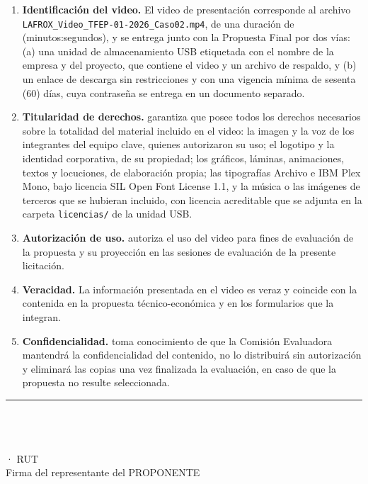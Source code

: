 \documentclass[carta,firma,final]{lafrox}
\newcommand{\campo}[1]{\underline{\makebox[#1]{}}}
\begin{document}
\begin{enumerate}
  \item \textbf{Identificación del video.} El video de presentación corresponde al archivo\linebreak
  \texttt{LAFROX\_Video\_TFEP-01-2026\_Caso02.mp4}, de una duración de \campo{1.6cm} (minutos:segundos),
  y se entrega junto con la Propuesta Final por dos vías: (a) una unidad de almacenamiento USB etiquetada con
  el nombre de la empresa y del proyecto, que contiene el video y un archivo de respaldo, y (b) un enlace de
  descarga sin restricciones y con una vigencia mínima de sesenta (60) días, cuya contraseña se entrega en un
  documento separado.

  \item \textbf{Titularidad de derechos.} \LFXempresa{} garantiza que posee todos los derechos necesarios
  sobre la totalidad del material incluido en el video: la imagen y la voz de los integrantes del equipo
  clave, quienes autorizaron su uso; el logotipo y la identidad corporativa, de su propiedad; los gráficos,
  láminas, animaciones, textos y locuciones, de elaboración propia; las tipografías Archivo e IBM Plex Mono,
  bajo licencia SIL Open Font License 1.1, y la música o las imágenes de terceros que se hubieran incluido,
  con licencia acreditable que se adjunta en la carpeta \texttt{licencias/} de la unidad USB.

  \item \textbf{Autorización de uso.} \LFXempresa{} autoriza el uso del video para fines de evaluación de la
  propuesta y su proyección en las sesiones de evaluación de la presente licitación.

  \item \textbf{Veracidad.} La información presentada en el video es veraz y coincide con la contenida en la
  propuesta técnico-económica y en los formularios que la integran.

  \item \textbf{Confidencialidad.} \LFXempresa{} toma conocimiento de que la Comisión Evaluadora mantendrá la
  confidencialidad del contenido, no lo distribuirá sin autorización y eliminará las copias una vez finalizada
  la evaluación, en caso de que la propuesta no resulte seleccionada.
\end{enumerate}

\begin{center}
\begin{minipage}{8.2cm}
  \centering
  \vspace*{1.3cm}%
  {\color{lafroxTinta}\rule{8.2cm}{0.6pt}}\\[4pt]
  {\intersemibold \LFXrepresentante}\\
  {\intermedium\fontsize{10pt}{13pt}\selectfont \LFXcargo}\\
  {\intermedium\fontsize{10pt}{13pt}\selectfont \LFXempresa{} · RUT \LFXrut}\\[2pt]
  {\LFXchico Firma del representante del PROPONENTE}
\end{minipage}
\end{center}
\end{document}
